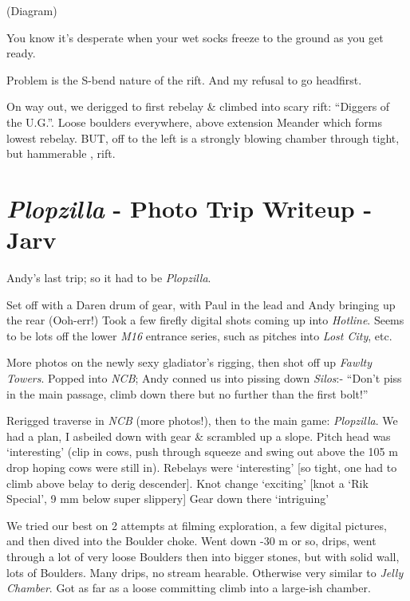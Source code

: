 (Diagram)

You know it's desperate when your wet socks freeze to the ground as you
get ready.

Problem is the S-bend nature of the rift. And my refusal to go
headfirst.

On way out, we derigged to first rebelay \& climbed into scary rift:
``Diggers of the U.G.''. Loose boulders everywhere, above extension
Meander which forms lowest rebelay. BUT, off to the left is a strongly
blowing chamber through tight, but hammerable , rift.

\hypertarget{plopzilla---photo-trip-writeup---jarv}{%
\section{\texorpdfstring{\emph{Plopzilla} - Photo Trip Writeup -
Jarv}{Plopzilla - Photo Trip Writeup - Jarv}}\label{plopzilla---photo-trip-writeup---jarv}}

Andy's last trip; so it had to be \emph{Plopzilla}.

Set off with a Daren drum of gear, with Paul in the lead and Andy
bringing up the rear (Ooh-err!) Took a few firefly digital shots coming
up into \emph{Hotline}. Seems to be lots off the lower \emph{M16}
entrance series, such as pitches into \emph{Lost City}, etc.

More photos on the newly sexy gladiator's rigging, then shot off up
\emph{Fawlty Towers}. Popped into \emph{NCB}; Andy conned us into
pissing down \emph{Silos}:- ``Don't piss in the main passage, climb down
there but no further than the first bolt!''

Rerigged traverse in \emph{NCB} (more photos!), then to the main game:
\emph{Plopzilla}. We had a plan, I asbeiled down with gear \& scrambled
up a slope. Pitch head was `interesting' (clip in cows, push through
squeeze and swing out above the 105 m drop hoping cows were still in).
Rebelays were `interesting' {[}so tight, one had to climb above belay to
derig descender{]}. Knot change `exciting' {[}knot a `Rik Special', 9 mm
below super slippery{]} Gear down there `intriguing'

We tried our best on 2 attempts at filming exploration, a few digital
pictures, and then dived into the Boulder choke. Went down -30 m or so,
drips, went through a lot of very loose Boulders then into bigger
stones, but with solid wall, lots of Boulders. Many drips, no stream
hearable. Otherwise very similar to \emph{Jelly Chamber}. Got as far as
a loose committing climb into a large-ish chamber.

